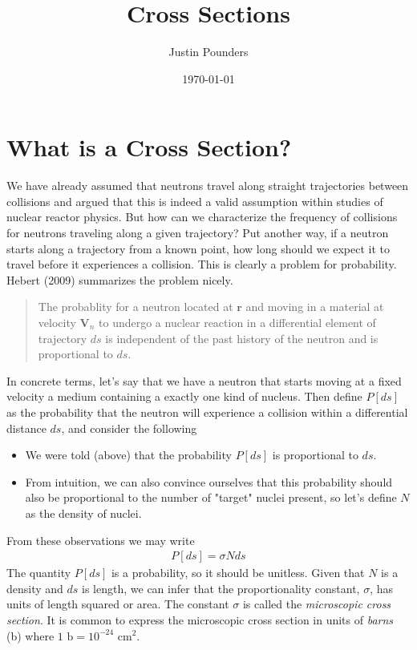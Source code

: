 \documentclass[11pt]{article}
\author{Justin Pounders}
\date{\today}
\title{Cross Sections}
\renewcommand\vec{\mathbf}
\begin{document}
\maketitle
\tableofcontents

\section{What is a Cross Section?}
\label{sec:orgheadline1}
We have already assumed that neutrons travel along straight trajectories between collisions and argued that this is indeed a valid assumption within studies of nuclear reactor physics.  But how can we characterize the frequency of collisions for neutrons traveling along a given trajectory?  Put another way, if a neutron starts along a trajectory from a known point, how long should we expect it to travel before it experiences a collision.  This is clearly a problem for probability.  Hebert (2009) summarizes the problem nicely.

\begin{quote}
The probablity for a neutron located at \(\vec{r}\) and moving in a material at velocity \(\vec{V}_n\) to undergo a nuclear reaction in a differential element of trajectory \(ds\) is independent of the past history of the neutron and is proportional to \(ds\).
\end{quote}

In concrete terms, let's say that we have a  neutron that starts moving at a fixed velocity a medium  containing a exactly one kind of nucleus.  Then define \(P[ds]\) as the probability that the neutron will experience a collision within a differential distance \(ds\), and consider the following
\begin{itemize}
\item We were told (above) that the probability \(P[ds]\) is proportional to \(ds\).
\item From intuition, we can also convince ourselves that this probability should also be proportional to the number of "target" nuclei present, so let's define \(N\) as the density of nuclei.
\end{itemize}
From these observations we may write
\begin{align}
  P[ds] = \sigma N ds
\end{align}
The quantity \(P[ds]\) is a probability, so it should be unitless.  Given that \(N\) is a density and \(ds\) is length, we can infer that the proportionality constant, \(\sigma\), has units of length squared or area.  The constant \(\sigma\) is called the \emph{microscopic cross section}.  It is common to express the microscopic cross section in units of \emph{barns} (b) where \(1 \text{ b} = 10^{-24} \text{ cm}^2\).
\end{document}
